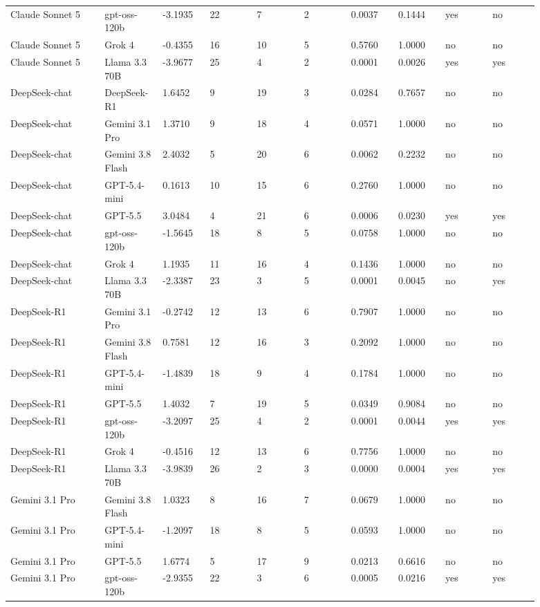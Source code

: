 \begin{landscape}
\begin{longtable}{p{0.162\linewidth}p{0.081\linewidth}p{0.081\linewidth}p{0.081\linewidth}p{0.081\linewidth}p{0.081\linewidth}p{0.081\linewidth}p{0.081\linewidth}p{0.081\linewidth}p{0.081\linewidth}}
Claude Sonnet 5 & gpt-oss-120b & -3.1935 & 22 & 7 & 2 & 0.0037 & 0.1444 & yes & no \\
Claude Sonnet 5 & Grok 4 & -0.4355 & 16 & 10 & 5 & 0.5760 & 1.0000 & no & no \\
Claude Sonnet 5 & Llama 3.3 70B & -3.9677 & 25 & 4 & 2 & 0.0001 & 0.0026 & yes & yes \\
DeepSeek-chat & DeepSeek-R1 & 1.6452 & 9 & 19 & 3 & 0.0284 & 0.7657 & no & no \\
DeepSeek-chat & Gemini 3.1 Pro & 1.3710 & 9 & 18 & 4 & 0.0571 & 1.0000 & no & no \\
DeepSeek-chat & Gemini 3.8 Flash & 2.4032 & 5 & 20 & 6 & 0.0062 & 0.2232 & no & no \\
DeepSeek-chat & GPT-5.4-mini & 0.1613 & 10 & 15 & 6 & 0.2760 & 1.0000 & no & no \\
DeepSeek-chat & GPT-5.5 & 3.0484 & 4 & 21 & 6 & 0.0006 & 0.0230 & yes & yes \\
DeepSeek-chat & gpt-oss-120b & -1.5645 & 18 & 8 & 5 & 0.0758 & 1.0000 & no & no \\
DeepSeek-chat & Grok 4 & 1.1935 & 11 & 16 & 4 & 0.1436 & 1.0000 & no & no \\
DeepSeek-chat & Llama 3.3 70B & -2.3387 & 23 & 3 & 5 & 0.0001 & 0.0045 & no & yes \\
DeepSeek-R1 & Gemini 3.1 Pro & -0.2742 & 12 & 13 & 6 & 0.7907 & 1.0000 & no & no \\
DeepSeek-R1 & Gemini 3.8 Flash & 0.7581 & 12 & 16 & 3 & 0.2092 & 1.0000 & no & no \\
DeepSeek-R1 & GPT-5.4-mini & -1.4839 & 18 & 9 & 4 & 0.1784 & 1.0000 & no & no \\
DeepSeek-R1 & GPT-5.5 & 1.4032 & 7 & 19 & 5 & 0.0349 & 0.9084 & no & no \\
DeepSeek-R1 & gpt-oss-120b & -3.2097 & 25 & 4 & 2 & 0.0001 & 0.0044 & yes & yes \\
DeepSeek-R1 & Grok 4 & -0.4516 & 12 & 13 & 6 & 0.7756 & 1.0000 & no & no \\
DeepSeek-R1 & Llama 3.3 70B & -3.9839 & 26 & 2 & 3 & 0.0000 & 0.0004 & yes & yes \\
Gemini 3.1 Pro & Gemini 3.8 Flash & 1.0323 & 8 & 16 & 7 & 0.0679 & 1.0000 & no & no \\
Gemini 3.1 Pro & GPT-5.4-mini & -1.2097 & 18 & 8 & 5 & 0.0593 & 1.0000 & no & no \\
Gemini 3.1 Pro & GPT-5.5 & 1.6774 & 5 & 17 & 9 & 0.0213 & 0.6616 & no & no \\
Gemini 3.1 Pro & gpt-oss-120b & -2.9355 & 22 & 3 & 6 & 0.0005 & 0.0216 & yes & yes \\

\end{longtable}
\end{landscape}
